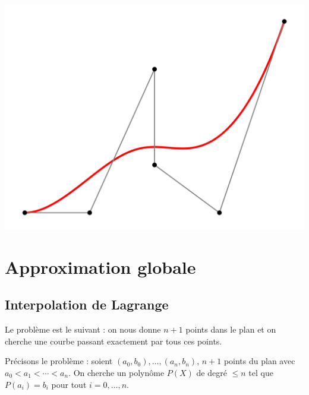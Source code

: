 \documentclass[11pt,class=report,crop=false]{standalone}
\begin{document}
\begin{center}
  \includegraphics[scale=\myscale,scale=0.4]{figures/approx-bezier-01}
\end{center}



\section{Approximation globale}

\subsection{Interpolation de Lagrange}


Le problème est le suivant : on nous donne $n+1$ points  dans le plan et on cherche une courbe passant exactement par tous ces points.

Précisons le problème : soient $(a_0,b_0),\ldots,(a_n,b_n)$, $n+1$ points du plan avec $a_0 < a_1 < \cdots < a_n$.
On cherche un polynôme $P(X)$ de degré $\le n$ tel que $P(a_i) = b_i$ pour tout $i=0,\ldots,n$.
\end{document}
